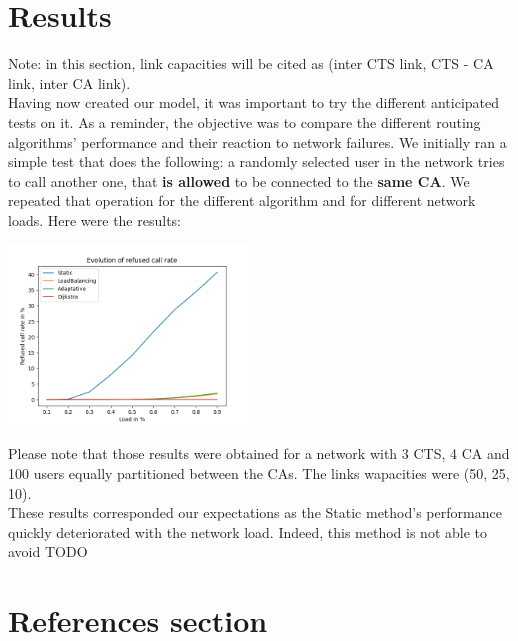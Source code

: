\documentclass[lettersize,journal]{IEEEtran} %
\begin{document}
\section{Results}
Note: in this section, link capacities will be cited as (inter CTS link, CTS - CA link, inter CA link).\\
Having now created our model, it was important to try the different anticipated tests on it. As a reminder, the objective was to
compare the different routing algorithms' performance and their reaction to network failures.
We initially ran a simple test that does the following: a randomly selected user in the network tries to call another one, that
\textbf{is allowed} to be connected to the \textbf{same CA}. We repeated that operation for the different algorithm and for different
network loads. Here were the results:
\begin{center}
\includegraphics[width=0.48\textwidth]{call_rate.png}
\end{center}
Please note that those results were obtained for a network with 3 CTS, 4 CA and 100 users equally partitioned between the CAs. The
links wapacities were (50, 25, 10).\\
These results corresponded our expectations as the Static method's performance quickly deteriorated with the network load. Indeed, 
this method is not able to avoid TODO

\section{References section}
\end{document}
